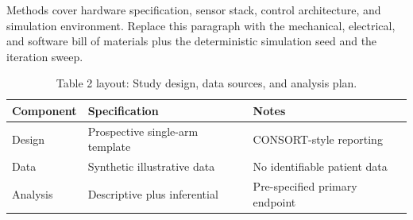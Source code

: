 
Methods cover hardware specification, sensor stack, control architecture, and simulation environment. Replace this paragraph with the mechanical, electrical, and software bill of materials plus the deterministic simulation seed and the iteration sweep.

\begin{table}[H]
\caption{Table 2 layout: Study design, data sources, and analysis plan.}
\label{tab:methods_design}
\centering
\begin{tabular}{>{\raggedright\arraybackslash}p{3.4cm} >{\raggedright\arraybackslash}p{4.6cm} >{\raggedright\arraybackslash}p{5.4cm}}
\toprule
\textbf{Component} & \textbf{Specification} & \textbf{Notes} \\
\midrule
  Design & Prospective single-arm template & CONSORT-style reporting \\
  Data & Synthetic illustrative data & No identifiable patient data \\
  Analysis & Descriptive plus inferential & Pre-specified primary endpoint \\
\bottomrule
\end{tabular}
\end{table}
